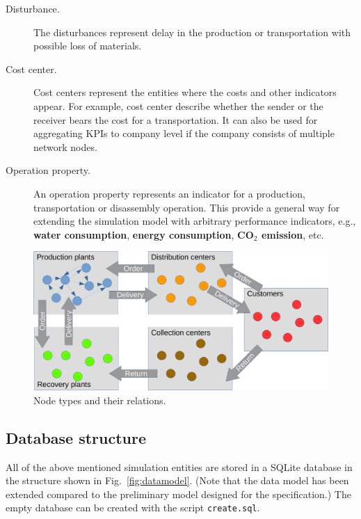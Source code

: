 \documentclass{article}
\begin{document}
\begin{description}
\item[Disturbance.] The disturbances represent delay in the production or transportation with possible loss of materials.

\item[Cost center.] Cost centers represent the entities where the costs and other indicators appear. For example, cost center describe whether the sender or the receiver bears the cost for a transportation. It can also be used for aggregating KPIs to company level if the company consists of multiple network nodes.

\item[Operation property.] An operation property represents an indicator for a production, transportation or disassembly operation. This provide a general way for extending the simulation model with arbitrary performance indicators, e.g., \textbf{water consumption}, \textbf{energy consumption}, \textbf{CO$_2$ emission}, etc.
\end{description}


\begin{figure}[ht!]
	\center
	\includegraphics[width=\textwidth]{nodes-crop.pdf} 
	\caption{Node types and their relations.}\label{fig:nodes}
\end{figure}

\subsection{Database structure\label{sec:database}}

All of the above mentioned simulation entities are stored in a SQLite database in the structure shown in Fig.~\ref{fig:datamodel}. (Note that the data model has been extended compared to the preliminary model designed for the specification.) The empty database can be created with the script \texttt{create.sql}.
\end{document}
